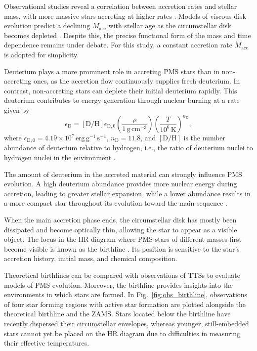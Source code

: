 \documentclass[12pt,a4paper]{article}
\newcommand{\mr}{\mathrm}
\begin{document}
Observational studies reveal a correlation between accretion rates and stellar mass, with more massive stars accreting at higher rates \parencite[e.g.,][]{MuzerolleEtAl2003,ManaraEtAl2017,RugelEtAl2018,LanzafameEtAl2023}. Models of viscous disk evolution predict a declining $\dot{M}_\mr{acc}$ with stellar age as the circumstellar disk becomes depleted \parencite[e.g.,][]{HartmannEtAl1998,GortiHollenbach2009}.  Despite this, the precise functional form of the mass and time dependence remains under debate. For this study, a constant accretion rate $\dot{M}_\mr{acc}$ is adopted for simplicity.

Deuterium plays a more prominent role in accreting PMS stars than in non-accreting ones, as the accretion flow continuously supplies fresh deuterium. In contrast, non-accreting stars can deplete their initial deuterium rapidly. This deuterium contributes to energy generation through nuclear burning at a rate given by
\begin{equation}
  \epsilon_\mr{D} = \left[\mr{D/H}\right]\epsilon_\mr{D,0} \left(\frac{\rho}{1\,\mr{g\,cm^{-3}}}\right) \left(\frac{T}{10^6\,\mr{K}}\right)^{n_\mr{D}}, \label{eq:deuterium_energy_prod_rate}
\end{equation}
where $\epsilon_\mr{D,0} = 4.19 \times 10^7\,\mr{erg\,g^{-1}\,s^{-1}}$, $n_\mr{D} = 11.8$, and $[\mr{D/H}]$ is the number abundance of deuterium relative to hydrogen, i.e., the ratio of deuterium nuclei to hydrogen nuclei in the environment \parencite[cf. Eq.~11.27 in][]{StahlerPalla2004}.

The amount of deuterium in the accreted material can strongly influence PMS evolution. A high deuterium abundance provides more nuclear energy during accretion, leading to greater stellar expansion, while a lower abundance results in a more compact star throughout its evolution toward the main sequence \parencite{KunitomoEtAl2017}.

When the main accretion phase ends, the circumstellar disk has mostly been dissipated and become optically thin, allowing the star to appear as a visible object. The locus in the HR diagram where PMS stars of different masses first become visible is known as the birthline \parencite{Stahler1983}. Its position is sensitive to the star's accretion history, initial mass, and chemical composition.

Theoretical birthlines can be compared with observations of TTSs to evaluate models of PMS evolution. Moreover, the birthline provides insights into the environments in which stars are formed. In Fig.~\ref{fig:obs_birthline}, observations of four star forming regions with active star formation are plotted alongside the theoretical birthline and the ZAMS. Stars located below the birthline have recently dispersed their circumstellar envelopes, whereas younger, still-embedded stars cannot yet be placed on the HR diagram due to difficulties in measuring their effective temperatures.
\end{document}

